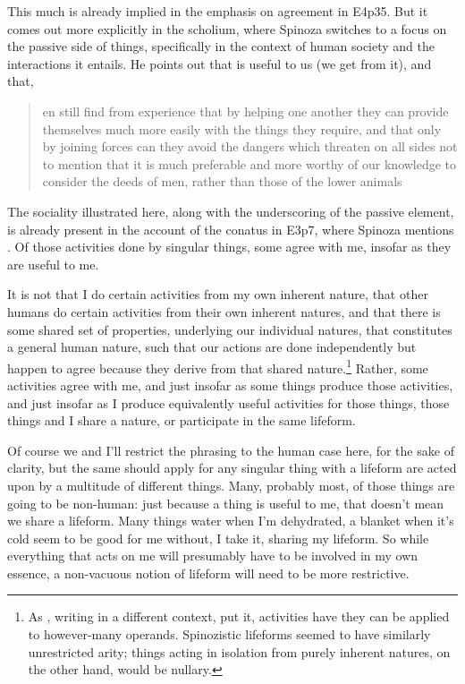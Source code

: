 \documentclass{article}
\newcommand{\dash}{\unskip{—}}
\begin{document}
This much is already implied in the emphasis on agreement in E4p35. But it comes out more explicitly in the scholium, where Spinoza switches to a focus on the passive side of things, specifically in the context of human society and the interactions it entails. He points out that  is useful to us (we get  from it), and that, \blockquote[][.]{en still find from experience that by helping one another they can provide themselves much more easily with the things they require, and that only by joining forces can they avoid the dangers which threaten on all sides \dash not to mention that it is much preferable and more worthy of our knowledge to consider the deeds of men, rather than those of the lower animals} The sociality illustrated here, along with the underscoring of the passive element, is already present in the account of the conatus in E3p7, where Spinoza mentions . Of those activities done by singular things, some agree with me, insofar as they are useful to me.

It is not that I do certain activities from my own inherent nature, that other humans do certain activities from their own inherent natures, and that there is some shared set of properties, underlying our individual natures, that constitutes a general human nature, such that our actions are done independently but happen to agree because they derive from that shared nature.\footnote{\label{fn:Arity}As \citeauthor{Illari&Williamson:2013}, writing in a different context, put it, activities have  \dash they can be applied to however-many operands. Spinozistic lifeforms seemed to have similarly unrestricted arity; things acting in isolation from purely inherent natures, on the other hand, would be nullary.}
Rather, some activities agree with me, and just insofar as some things produce those activities, and just insofar as I produce equivalently useful activities for those things, those things and I share a nature, or participate in the same lifeform.

Of course we \dash and I'll restrict the phrasing to the human case here, for the sake of clarity, but the same should apply for any singular thing with a lifeform \dash are acted upon by a multitude of different things. Many, probably most, of those things are going to be non-human: just because a thing is useful to me, that doesn't mean we share a lifeform. Many things \dash water when I'm dehydrated, a blanket when it's cold \dash seem to be good for me without, I take it, sharing my lifeform. So while everything that acts on me will presumably have to be involved in my own essence, a non-vacuous notion of lifeform will need to be more restrictive.
\end{document}
